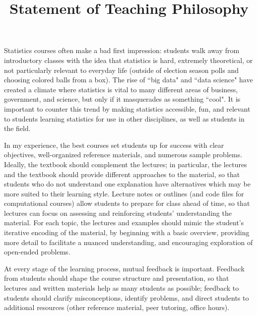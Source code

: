 \documentclass[11pt,letterpaper,sans,unicode]{moderncv}        %
\title{Statement of Teaching Philosophy}                               %
\begin{document}
\makecvtitle
\setlength{\parindent}{15pt} %

Statistics courses often make a bad first impression: students walk away from introductory classes with the idea that statistics is hard, extremely theoretical, or not particularly relevant to everyday life (outside of election season polls and choosing colored balls from a box). The rise of ``big data" and ``data science" have created a climate where statistics is vital to many different areas of business, government, and science, but only if it masquerades as something ``cool". It is important to counter this trend by making statistics accessible, fun, and relevant to students learning statistics for use in other disciplines, as well as students in the field. 

\vspace{.65cm}\hspace{8pt}
In my experience, the best courses set students up for success with clear objectives, well-organized reference materials, and numerous sample problems. Ideally, the textbook should complement the lectures; in particular, the lectures and the textbook should provide different approaches to the material, so that students who do not understand one explanation have alternatives which may be more suited to their learning style. Lecture notes or outlines (and code files for computational courses) allow students to prepare for class ahead of time, so that lectures can focus on assessing and reinforcing students' understanding the material. For each topic, the lectures and examples should mimic the student's iterative encoding of the material, by beginning with a basic overview, providing more detail to facilitate a nuanced understanding, and encouraging exploration of open-ended problems.  

\vspace{.65cm}\hspace{8pt}
At every stage of the learning process, mutual feedback is important. Feedback from students should shape the course structure and presentation, so that lectures and written materials help as many students as possible; feedback to students should clarify misconceptions, identify problems, and direct students to additional resources (other reference material, peer tutoring, office hours). 
\end{document}
